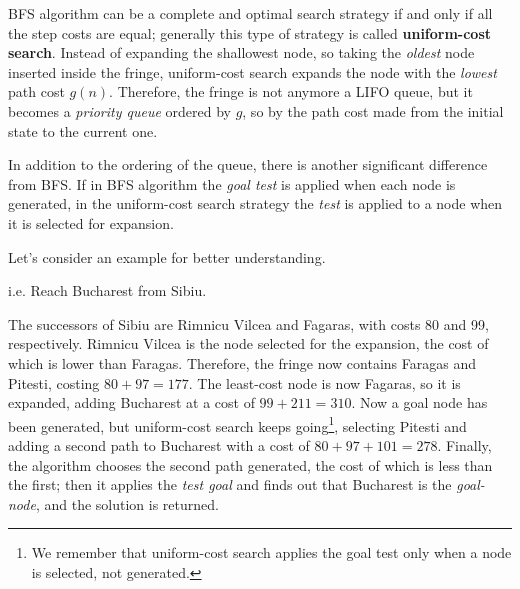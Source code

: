 BFS algorithm can be a complete and optimal search strategy if and only if all the step costs are equal; generally this type of strategy is called \textbf{uniform-cost search}.
Instead of expanding the shallowest node, so taking the \textit{oldest} node inserted inside the fringe, uniform-cost search expands the node with the \textit{lowest}
path cost $g(n)$. Therefore, the fringe is not anymore a LIFO queue, but it becomes a \textit{priority queue} ordered by $g$, so by the path cost made from the initial state 
to the current one. \vspace{3.5pt}

In addition to the ordering of the queue, there is another significant difference from BFS. If in BFS algorithm the \textit{goal test} is applied when each node is generated,
in the uniform-cost search strategy the \textit{test} is applied to a node when it is selected for expansion. \vspace{3.5pt}

Let's consider an example for better understanding. 
\begin{example}
    i.e. Reach Bucharest from Sibiu.
    \begin{center}
    \end{center}
    The successors of Sibiu are Rimnicu Vilcea and Fagaras, with costs 80 and 99, respectively. Rimnicu Vilcea is the node selected for the expansion, the cost of which is lower than Faragas.
    Therefore, the fringe now contains Faragas and Pitesti, costing $80 + 97 = 177$. The least-cost node is now Fagaras, so it is expanded, adding Bucharest at a cost of $99 + 211 = 310$.
    Now a goal node has been generated, but uniform-cost search keeps going\footnote{We remember that uniform-cost search applies the goal test only when a node is selected, not generated.},
    selecting Pitesti and adding a second path to Bucharest with a cost of $80 + 97 + 101 = 278$. Finally, the algorithm chooses the second path generated, the cost of which is less than 
    the first; then it applies the \textit{test goal} and finds out that Bucharest is the \textit{goal-node}, and the solution is returned.
\end{example}